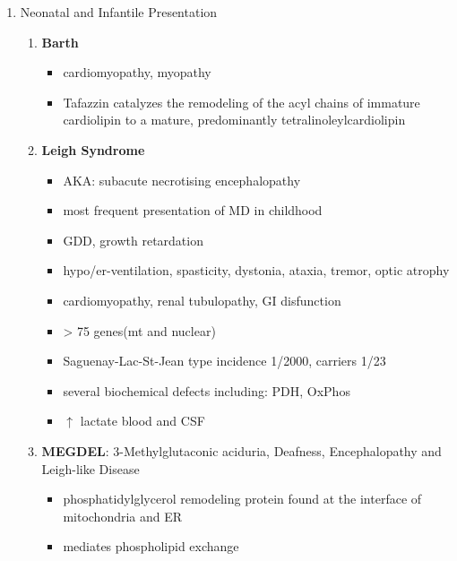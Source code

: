 \documentclass{scrartcl}
\begin{document}
\begin{enumerate}
\item Neonatal and Infantile Presentation
\label{sec:org8fad509}
\begin{enumerate}
\item \textbf{Barth}
\label{sec:org2b48bab}
\begin{itemize}
\item cardiomyopathy, myopathy
\item Tafazzin catalyzes the remodeling of the acyl chains of immature
cardiolipin to a mature, predominantly tetralinoleylcardiolipin
\end{itemize}
\item \textbf{Leigh Syndrome}
\label{sec:org274e34c}
\begin{itemize}
\item AKA: subacute necrotising encephalopathy
\item most frequent presentation of MD in childhood
\item GDD, growth retardation
\item hypo/er-ventilation, spasticity, dystonia, ataxia, tremor, optic atrophy
\item cardiomyopathy, renal tubulopathy, GI disfunction
\item \textgreater{} 75 genes(mt and nuclear)
\item Saguenay-Lac-St-Jean type incidence 1/2000, carriers 1/23
\item several biochemical defects including: PDH, OxPhos
\item \(\uparrow\) lactate blood and CSF
\end{itemize}
\item \textbf{MEGDEL}: 3-Methylglutaconic aciduria, Deafness, Encephalopathy and Leigh-like Disease
\label{sec:org05ee780}
\begin{itemize}
\item phosphatidylglycerol remodeling protein found at the interface of
mitochondria and ER
\item mediates phospholipid exchange
\end{itemize}


\end{enumerate}
\end{enumerate}
\end{document}
